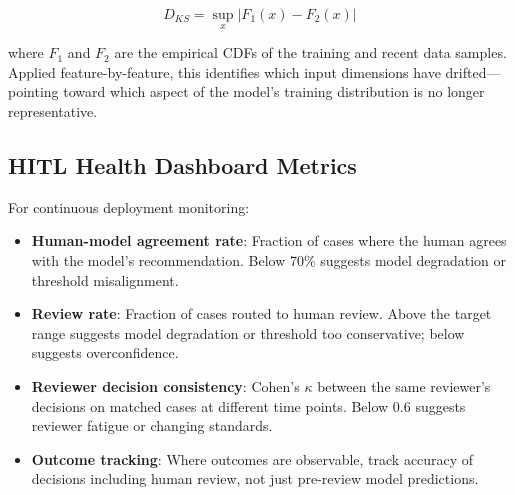 \begin{equation}
D_{KS} = \sup_x |F_1(x) - F_2(x)|
\label{eq:ks-test}
\end{equation}

where $F_1$ and $F_2$ are the empirical CDFs of the training and recent data samples. Applied feature-by-feature, this identifies which input dimensions have drifted---pointing toward which aspect of the model's training distribution is no longer representative.

\subsection{HITL Health Dashboard Metrics}

For continuous deployment monitoring:

\begin{itemize}
    \item \textbf{Human-model agreement rate}: Fraction of cases where the human agrees with the model's recommendation. Below 70\% suggests model degradation or threshold misalignment.
    \item \textbf{Review rate}: Fraction of cases routed to human review. Above the target range suggests model degradation or threshold too conservative; below suggests overconfidence.
    \item \textbf{Reviewer decision consistency}: Cohen's $\kappa$ between the same reviewer's decisions on matched cases at different time points. Below 0.6 suggests reviewer fatigue or changing standards.
    \item \textbf{Outcome tracking}: Where outcomes are observable, track accuracy of decisions including human review, not just pre-review model predictions.
\end{itemize}
\apxnumoff
